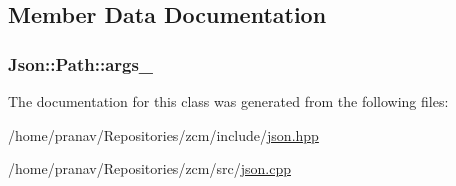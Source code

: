 \subsection{Member Data Documentation}
\subsubsection[{\texorpdfstring{args\+\_\+}{args_}}]{ Json\+::\+Path\+::args\+\_\+\hspace{0.3cm}{\ttfamily [private]}}\hypertarget{classJson_1_1Path_af33d0de7ee9f99d3e361bdf504dc2bc7}{}\label{classJson_1_1Path_af33d0de7ee9f99d3e361bdf504dc2bc7}


The documentation for this class was generated from the following files\+:\begin{DoxyCompactItemize}
\item 
/home/pranav/\+Repositories/zcm/include/\hyperlink{json_8hpp}{json.\+hpp}\item 
/home/pranav/\+Repositories/zcm/src/\hyperlink{json_8cpp}{json.\+cpp}\end{DoxyCompactItemize}
